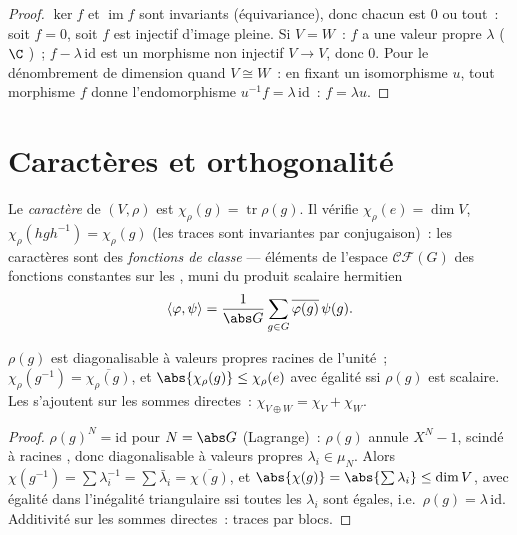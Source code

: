 \begin{proof}
$\ker f$ et $\operatorname{im} f$ sont invariants
(équivariance), donc chacun est $0$ ou tout~: soit $f = 0$, soit
$f$ est injectif d'image pleine. Si $V = W$~: $f$ a une valeur
propre $\lambda$ ($\C$ )~; $f -
\lambda\,\mathrm{id}$ est un morphisme non injectif $V \to V$,
donc $0$. Pour le dénombrement de dimension quand $V \cong W$~:
en fixant un isomorphisme $u$, tout morphisme $f$ donne
l'endomorphisme $u^{-1}f = \lambda\,\mathrm{id}$~: $f =
\lambda u$.
\end{proof}

\section{Caractères et orthogonalité}

\begin{definition}\label{def:b3:representations:character}
Le \emph{caractère} de $(V, \rho)$ est
$\chi_\rho(g) = \operatorname{tr}\rho(g)$. Il vérifie
$\chi_\rho(e) = \dim V$, $\chi_\rho(hgh^{-1}) = \chi_\rho(g)$
(les traces sont invariantes par conjugaison)~: les caractères
sont des \emph{fonctions de classe}
--- éléments de l'espace $\mathcal{CF}(G)$ des fonctions
constantes sur les , muni du produit
scalaire hermitien
\[
\langle \varphi, \psi\rangle = \frac1{\abs G}\sum_{g \in G}
\overline{\varphi(g)}\,\psi(g).
\]
\end{definition}

\begin{proposition}\label{prop:b3:representations:charbasics}
$\rho(g)$ est diagonalisable à valeurs propres racines de
l'unité~; $\chi_\rho(g^{-1}) = \overline{\chi_\rho(g)}$, et
$\abs{\chi_\rho(g)} \leq \chi_\rho(e)$ avec égalité ssi
$\rho(g)$ est scalaire. Les  s'ajoutent sur les
sommes directes~: $\chi_{V \oplus W} = \chi_V + \chi_W$.
\end{proposition}

\begin{proof}
$\rho(g)^N = \mathrm{id}$ pour $N = \abs G$ (Lagrange)~:
$\rho(g)$ annule $X^N - 1$, scindé à racines , donc
diagonalisable à valeurs propres $\lambda_i \in \mu_N$. Alors
$\chi(g^{-1}) = \sum \lambda_i^{-1} = \sum\bar\lambda_i =
\overline{\chi(g)}$, et $\abs{\chi(g)} = \abs{\sum\lambda_i}
\leq \dim V$, avec égalité dans l'inégalité triangulaire ssi
toutes les $\lambda_i$ sont égales, i.e.\ $\rho(g) =
\lambda\,\mathrm{id}$. Additivité sur les sommes directes~:
traces par blocs.
\end{proof}

